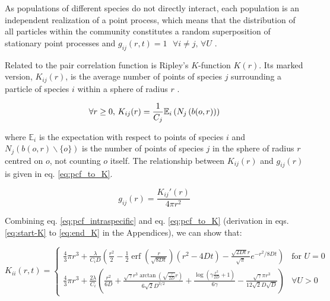 \documentclass[english]{article}
\DeclareMathOperator\erf{erf}
\begin{document}
As populations of different species do not directly interact, each
population is an independent realization of a point process, which
means that the distribution of all particles within the community
constitutes a random superposition of stationary point processes and
$g_{ij}(r,t)=1\text{ }\forall i\neq j,\,\forall U$ \citep[ p. 326, eq. 5.3.13]{illian2008statistical}.\medskip{}

Related to the pair correlation function is Ripley's $K$-function
$K(r)$. Its marked version, $K_{ij}(r)$, is the average number of
points of species $j$ surrounding a particle of species $i$ within
a sphere of radius $r$ \citep{illian2008statistical}.

\begin{equation}
\forall r\geq0\textmd{, }K_{ij}(r)=\frac{1}{C_{j}}\mathbb{E}_{i}\left(N_{j}\left(b(o,r)\right)\right)
\end{equation}

where $\mathbb{E}_{i}$ is the expectation with respect to points
of species $i$ and $N_{j}\left(b(o,r)\backslash\{o\}\right)$ is
the number of points of species $j$ in the sphere of radius $r$
centred on $o$, not counting $o$ itself. The relationship between
$K_{ij}(r)$ and $g_{ij}(r)$ is given in eq. \ref{eq:pcf_to_K}.

\begin{equation}
g_{ij}(r)=\frac{K_{ij}'(r)}{4\pi r^{2}}\label{eq:pcf_to_K}
\end{equation}

Combining eq. \ref{eq:pcf_intraspecific} and eq. \ref{eq:pcf_to_K}
(derivation in eqs. \ref{eq:start-K} to \ref{eq:end_K} in the Appendices),
we can show that:

\begin{doublespace}
\begin{equation}
K_{ii}(r,t)=\begin{cases}
\frac{4}{3}\pi r^{3}+\frac{\lambda}{C_{i}D}\left(\frac{r^{2}}{2}-\frac{1}{2}\erf(\frac{r}{\sqrt{8Dt}})(r^{2}-4Dt)-\frac{\sqrt{2Dt}r}{\sqrt{\pi}}e^{-r^{2}/8Dt}\right) & \text{for }U=0\\
\frac{4}{3}\pi r^{3}+\frac{2\lambda}{C_{i}}\left(\frac{r^{2}}{6D}+\frac{\sqrt{\gamma}r^{3}\arctan(\sqrt{\frac{\gamma}{2D}}r)}{6\sqrt{2}D^{3/2}}+\frac{\log\left(\gamma\frac{r^{2}}{2D}+1\right)}{6\gamma}-\frac{\sqrt{\gamma}\pi r^{3}}{12\sqrt{2}D\sqrt{D}}\right) & \forall U>0
\end{cases}\label{eq:K_intraspecific}
\end{equation}

\end{doublespace}
\end{document}
